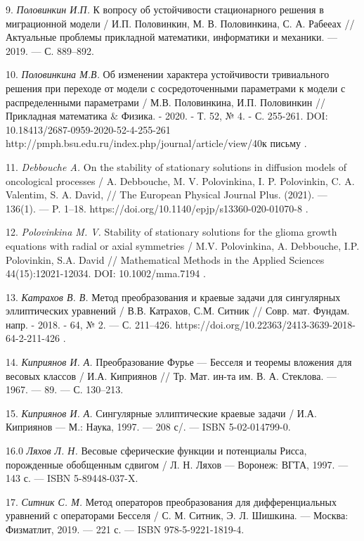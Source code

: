 
9. {\it Половинкин И.П.} К вопросу об устойчивости стационарного
решения в миграционной модели / И.П. Половинкин, М. В.
Половинкина, С. А. Рабееах // Актуальные проблемы прикладной
математики, информатики и механики. --- 2019. --- С. 889--892.

10. {\it Половинкина М.В.} Об изменении характера устойчивости
тривиального решения при переходе от модели с сосредоточенными
параметрами к модели с распределенными параметрами / М.В.
Половинкина, И.П. Половинкин // Прикладная математика $\&$ Физика.
- 2020. -  Т. 52, № 4. - С. 255-261. DOI:
10.18413/2687-0959-2020-52-4-255-261
http://pmph.bsu.edu.ru/index.php/journal/article/view/40к письму .



11. {\it Debbouche A.} On the stability of stationary solutions in
diffusion models of oncological processes / A. Debbouche, M. V.
Polovinkina, I. P. Polovinkin, C. A. Valentim, S. A. David, // The
European Physical Journal Plus. (2021). --- 136(1). --- P. 1--18.
https://doi.org/10.1140/epjp/s13360-020-01070-8 .

12. {\it  Polovinkina M. V.} Stability of stationary solutions for
the glioma growth equations with radial or axial symmetries / M.V.
Polovinkina, A. Debbouche, I.P. Polovinkin, S.A. David //
Mathematical Methods in the Applied Sciences 44(15):12021-12034.
DOI: 10.1002/mma.7194 .


13. {\it Катрахов В. В.} Метод преобразования и краевые задачи для
сингулярных эллиптических уравнений / В.В. Катрахов, С.М. Ситник
// Совр. мат. Фундам. напр. - 2018. - 64, № 2. --- С. 211--426.
https://doi.org/10.22363/2413-3639-2018-64-2-211-426 .

14. {\it Киприянов И. А.} Преобразование Фурье --- Бесселя и
теоремы вложения для весовых классов / И.А. Киприянов // Тр. Мат.
ин-та им. В. А. Стеклова. --- 1967. --- 89. --- С. 130--213.

15. {\it Киприянов И. А.} Сингулярные эллиптические краевые задачи
/ И.А. Киприянов --- М.: Наука, 1997. --- 208 с/. --- ISBN
5-02-014799-0.

16.0 {\it Ляхов Л. Н.} Весовые сферические функции и потенциалы
Рисса, порожденные обобщенным сдвигом / Л. Н. Ляхов --- Воронеж:
ВГТА, 1997. --- 143 с. --- ISBN 5-89448-037-X.

17. {\it Ситник С. М.} Метод операторов преобразования для
дифференциальных уравнений с операторами Бесселя / С. М. Ситник,
Э. Л. Шишкина. --- Москва: Физматлит, 2019. --- 221 с. --- ISBN
978-5-9221-1819-4.







